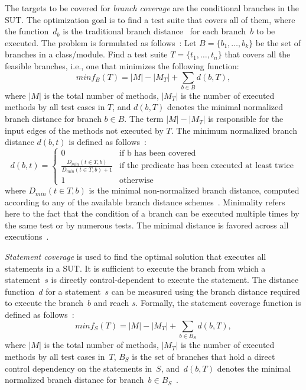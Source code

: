\documentclass[paper=a4,%
  twoside,%
  BCOR4mm,%
  abstract=true,%
  toc=bibliography,%
  chapterprefix=true,%
  toc=bibliographynumbered,%
  open=right,%
  english,%
  pagesize=pdftex]{scrreprt}
\begin{document}
The targets to be covered for \emph{branch coverage} are the conditional branches in the \ac{SUT}. The optimization goal is to find a test suite that covers all of them, where the function~$d_b$ is the traditional branch distance~\cite{Pacheco_2007} for each branch~$b$ to be executed. The problem is formulated as follows~\cite{Fraser2014}: Let $B = \{b_1, \dots, b_k\}$ be the set of branches in a class/module. Find a test suite $T = \{t_1, \dots, t_n\}$ that covers all the feasible branches, i.e., one that minimizes the following function:
\begin{equation}
minf_B(T) = \left|M\right| - \left|M_T\right| + \sum_{b \in B}{d(b, T)},
\end{equation}
where $\left|M\right|$ is the total number of methods, $\left|M_T\right|$ is the number of executed methods by all test cases in $T$, and $d(b, T)$ denotes the minimal normalized branch distance for branch $b \in B$. The term $\left|M\right| - \left|M_T\right|$ is responsible for the input edges of the methods not executed by $T$. The minimum normalized branch distance $d(b, t)$ is defined as follows~\cite{Fraser_2013}:
\begin{equation}
d(b, t) = \left\{ \begin{array}{cl}
0 & \textrm{if b has been covered} \\
\frac{D_{min}(t \in T, b)}{D_{min}(t \in T, b) + 1} & \textrm{if the predicate has been executed at least twice} \\
1 & \textrm{otherwise}
\end{array} \right.
\end{equation}
where $D_{min}(t \in T, b)$ is the minimal non-normalized branch distance, computed according to any of the available branch distance schemes~\cite{McMinn_2004}. Minimality refers here to the fact that the condition of a branch can be executed multiple times by the same test or by numerous tests. The minimal distance is favored across all executions~\cite{Panichella2018}.

\emph{Statement coverage} is used to find the optimal solution that executes all statements in a \ac{SUT}. It is sufficient to execute the branch from which a statement~$s$ is directly control-dependent to execute the statement. The distance function~$d$ for a statement~$s$ can be measured using the branch distance required to execute the branch~$b$ and reach $s$. Formally, the statement coverage function is defined as follows~\cite{Fraser_2013}:
\begin{equation}
minf_S(T) = \left|M\right| - \left|M_T\right| + \sum_{b \in B_S}{d(b, T)},
\end{equation}
where $\left|M\right|$ is the total number of methods, $\left|M_T\right|$ is the number of executed methods by all test cases in~$T$, $B_S$ is the set of branches that hold a direct control dependency on the statements in~$S$, and~$d(b, T)$ denotes the minimal normalized branch distance for branch~$b \in B_S$~\cite{Panichella2018}.
\end{document}
